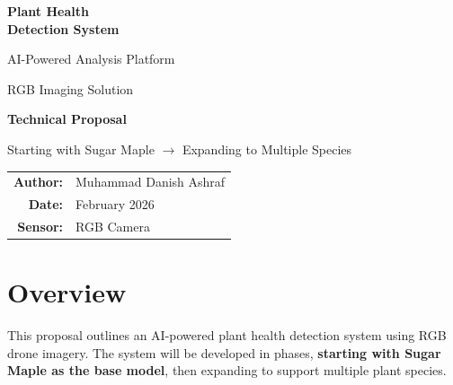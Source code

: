 \documentclass[11pt,a4paper]{article}
\begin{document}
\begin{titlepage}
\centering
\vspace*{2cm}

{\Huge\bfseries\color{primary} Plant Health\\[0.3cm] Detection System\par}
\vspace{0.5cm}
{\Large\color{secondary} AI-Powered Analysis Platform\par}
\vspace{0.3cm}
{\large\color{accent} RGB Imaging Solution\par}

\vspace{2cm}


\vspace{1.5cm}

{\large\textbf{Technical Proposal}\par}
\vspace{0.5cm}
{\large Starting with Sugar Maple $\rightarrow$ Expanding to Multiple Species\par}

\vspace{3cm}

\begin{tabular}{rl}
\textbf{Author:} & Muhammad Danish Ashraf \\
\textbf{Date:} & February 2026 \\
\textbf{Sensor:} & RGB Camera \\
\end{tabular}

\vfill

\end{titlepage}

\section{Overview}

This proposal outlines an AI-powered plant health detection system using RGB drone imagery. The system will be developed in phases, \textbf{starting with Sugar Maple as the base model}, then expanding to support multiple plant species.

\vspace{0.5cm}
\begin{center}
\end{center}
\end{document}
